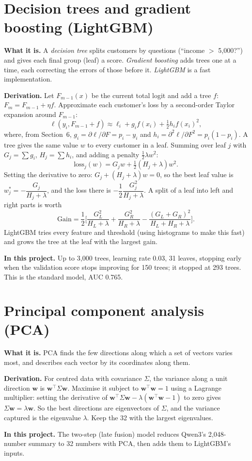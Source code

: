 \documentclass[10pt,a4paper]{article}
\newcommand{\what}[1]{\par\textbf{What it is.} #1}
\newcommand{\here}[1]{\par\textbf{In this project.} #1}
\newcommand{\deriv}{\par\textbf{Derivation.} }
\begin{document}
\section{Decision trees and gradient boosting (LightGBM)}
\what{A \emph{decision tree} splits customers by questions (``income $>$ 5,000?'') and gives each final group (leaf) a score. \emph{Gradient boosting} adds trees one at a time, each correcting the errors of those before it. \emph{LightGBM} is a fast implementation.}
\deriv Let $F_{m-1}(x)$ be the current total logit and add a tree $f$: $F_m=F_{m-1}+\eta f$. Approximate each customer's loss by a second-order Taylor expansion around $F_{m-1}$:
\[\ell(y_i,F_{m-1}+f)\approx\ell_i+g_if(x_i)+\tfrac12h_if(x_i)^2,\]
where, from Section~6, $g_i=\partial\ell/\partial F=p_i-y_i$ and $h_i=\partial^2\ell/\partial F^2=p_i(1-p_i)$. A tree gives the same value $w$ to every customer in a leaf. Summing over leaf $j$ with $G_j=\sum g_i$, $H_j=\sum h_i$, and adding a penalty $\frac12\lambda w^2$:
\[\text{loss}_j(w)=G_jw+\tfrac12(H_j+\lambda)w^2.\]
Setting the derivative to zero: $G_j+(H_j+\lambda)w=0$, so the best leaf value is $w_j^*=-\dfrac{G_j}{H_j+\lambda}$, and the loss there is $-\dfrac12\dfrac{G_j^2}{H_j+\lambda}$. A split of a leaf into left and right parts is worth
\[\text{Gain}=\frac12\Big[\frac{G_L^2}{H_L+\lambda}+\frac{G_R^2}{H_R+\lambda}-\frac{(G_L+G_R)^2}{H_L+H_R+\lambda}\Big].\]
LightGBM tries every feature and threshold (using histograms to make this fast) and grows the tree at the leaf with the largest gain.
\here{Up to 3,000 trees, learning rate 0.03, 31 leaves, stopping early when the validation score stops improving for 150 trees; it stopped at 293 trees. This is the standard model, AUC 0.765.}

\section{Principal component analysis (PCA)}
\what{PCA finds the few directions along which a set of vectors varies most, and describes each vector by its coordinates along them.}
\deriv For centred data with covariance $\Sigma$, the variance along a unit direction $\mathbf{w}$ is $\mathbf{w}^\top\Sigma\mathbf{w}$. Maximise it subject to $\mathbf{w}^\top\mathbf{w}=1$ using a Lagrange multiplier: setting the derivative of $\mathbf{w}^\top\Sigma\mathbf{w}-\lambda(\mathbf{w}^\top\mathbf{w}-1)$ to zero gives $\Sigma\mathbf{w}=\lambda\mathbf{w}$. So the best directions are eigenvectors of $\Sigma$, and the variance captured is the eigenvalue $\lambda$. Keep the 32 with the largest eigenvalues.
\here{The two-step (late fusion) model reduces Qwen3's 2,048-number summary to 32 numbers with PCA, then adds them to LightGBM's inputs.}
\end{document}
